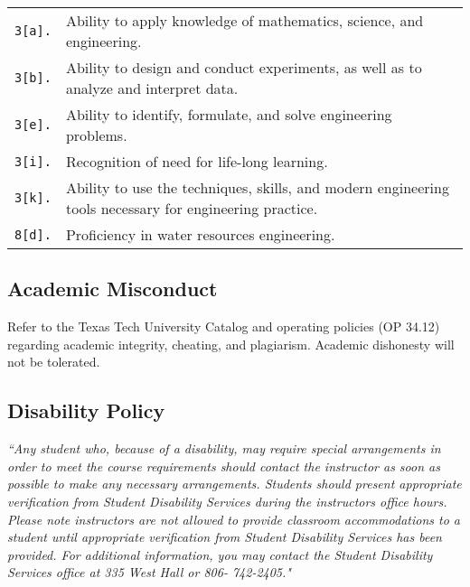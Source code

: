 \documentclass[12pt]{article}
\begin{document}
\begin{tabular}{p{0.5in}p{5.5in}}
\texttt{3[a].}  & Ability to apply knowledge of mathematics, science, and engineering.\\
\texttt{3[b].}  & Ability to design and conduct experiments, as well as to analyze and interpret data.\\
\texttt{3[e].}  & Ability to identify, formulate, and solve engineering problems.\\
\texttt{3[i].}   & Recognition of need for life-long learning.\\
\texttt{3[k].}  & Ability to use the techniques, skills, and modern engineering tools necessary for engineering practice.\\
\texttt{8[d].}  & Proficiency in water resources engineering.\\
\end{tabular}
\subsection*{Academic Misconduct}
Refer to the Texas Tech University Catalog and operating policies (OP 34.12) regarding
academic integrity, cheating, and plagiarism. Academic dishonesty will not be tolerated.
\subsection*{Disability Policy}
\textsl{ ``Any student who, because of a disability, may require special arrangements in order to meet
the course requirements should contact the instructor as soon as possible to make any necessary arrangements.
Students should present appropriate verification from Student Disability Services during the instructors office hours. Please note instructors are not allowed to provide classroom accommodations
to a student until appropriate verification from Student Disability Services has been provided.
For additional information, you may contact the Student Disability Services office at 335 West Hall or
806- 742-2405."}



\end{document}
